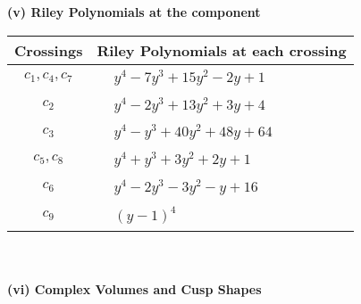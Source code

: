 \documentclass[1p]{elsarticle_modified}
\theoremstyle{definition}
\begin{document}
\newpage\renewcommand{\arraystretch}{1}
\flushleft \textbf{(v) Riley Polynomials at the component}\newline \\
\begin{tabular}{m{50pt}|m{274pt}}
Crossings & \hspace{64pt}Riley Polynomials at each crossing \\
\hline $$\begin{aligned}c_{1},c_{4},c_{7}\end{aligned}$$&$\begin{aligned}
&y^4-7 y^3+15 y^2-2 y+1
\end{aligned}$\\
\hline $$\begin{aligned}c_{2}\end{aligned}$$&$\begin{aligned}
&y^4-2 y^3+13 y^2+3 y+4
\end{aligned}$\\
\hline $$\begin{aligned}c_{3}\end{aligned}$$&$\begin{aligned}
&y^4- y^3+40 y^2+48 y+64
\end{aligned}$\\
\hline $$\begin{aligned}c_{5},c_{8}\end{aligned}$$&$\begin{aligned}
&y^4+y^3+3 y^2+2 y+1
\end{aligned}$\\
\hline $$\begin{aligned}c_{6}\end{aligned}$$&$\begin{aligned}
&y^4-2 y^3-3 y^2- y+16
\end{aligned}$\\
\hline $$\begin{aligned}c_{9}\end{aligned}$$&$\begin{aligned}
&(y-1)^4
\end{aligned}$\\
\hline
\end{tabular}\\~\\
\newpage\flushleft \textbf{(vi) Complex Volumes and Cusp Shapes}
\end{document}
